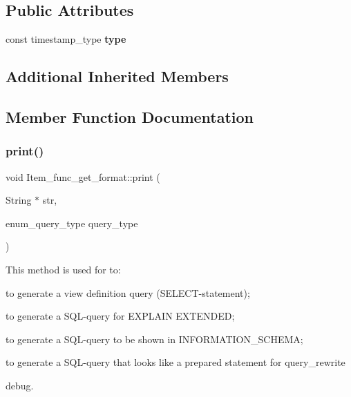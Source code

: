 \subsection*{Public Attributes}
\begin{DoxyCompactItemize}
\item 
\mbox{\label{classItem__func__get__format_afb6d2b0621cfd8ff46a34faa55d63a44}} 
const timestamp\+\_\+type {\bfseries type}
\end{DoxyCompactItemize}
\subsection*{Additional Inherited Members}


\subsection{Member Function Documentation}
\mbox{\label{classItem__func__get__format_a9de8cf490a3cdfbef5f1c7e42e0d20f2}} 
\subsubsection{\texorpdfstring{print()}{print()}}
{\footnotesize\ttfamily void Item\+\_\+func\+\_\+get\+\_\+format\+::print (\begin{DoxyParamCaption}\item[{String $\ast$}]{str,  }\item[{enum\+\_\+query\+\_\+type}]{query\+\_\+type }\end{DoxyParamCaption})\hspace{0.3cm}{\ttfamily [virtual]}}

This method is used for to\+:
\begin{DoxyItemize}
\item to generate a view definition query (S\+E\+L\+E\+CT-\/statement);
\item to generate a S\+QL-\/query for E\+X\+P\+L\+A\+IN E\+X\+T\+E\+N\+D\+ED;
\item to generate a S\+QL-\/query to be shown in I\+N\+F\+O\+R\+M\+A\+T\+I\+O\+N\+\_\+\+S\+C\+H\+E\+MA;
\item to generate a S\+QL-\/query that looks like a prepared statement for query\+\_\+rewrite
\item debug.
\end{DoxyItemize}

